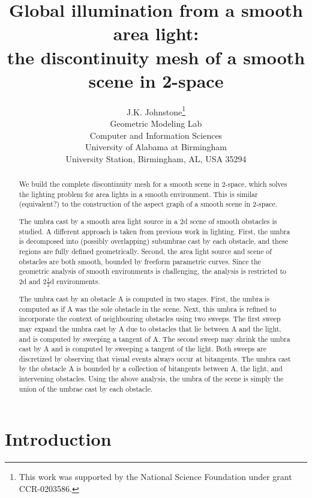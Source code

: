 \documentclass[9pt]{article}
\title{Global illumination from a smooth area light:\\the discontinuity mesh of a smooth scene in 2-space}
\author{J.K. Johnstone\thanks{This work was supported by the National Science Foundation under grant CCR-0203586.}\\
Geometric Modeling Lab\\
Computer and Information Sciences\\
University of Alabama at Birmingham\\
University Station, Birmingham, AL, USA 35294}
\begin{document}
\maketitle


\begin{abstract}

We build the complete discontinuity mesh for a smooth scene in 2-space,
which solves the lighting problem for area lights in a smooth environment.
This is similar (equivalent?) to the construction of the aspect graph
of a smooth scene in 2-space.

The umbra cast by a smooth area light source in a 2d scene of smooth
obstacles is studied.
A different approach is taken from previous work in lighting.
First, the umbra is decomposed into (possibly overlapping) subumbrae cast
by each obstacle, and these regions are fully defined geometrically.
Second, the area light source and scene of obstacles are both smooth,
bounded by freeform parametric curves.
Since the geometric analysis of smooth environments is challenging,
the analysis is restricted to 2d and 2$\frac{1}{2}$d environments.

The umbra cast by an obstacle A is computed in two stages.
First, the umbra is computed as if A was the sole obstacle in the scene.
Next, this umbra is refined to incorporate the context of neighbouring
obstacles using two sweeps.
The first sweep may expand the umbra cast by A due to obstacles that
lie between A and the light, and is computed by sweeping a tangent of A.
The second sweep may shrink the umbra cast by A and is computed by
sweeping a tangent of the light.
Both sweeps are discretized by observing that visual events always occur
at bitangents.
The umbra cast by the obstacle A is bounded by a collection of bitangents
between A, the light, and intervening obstacles.
Using the above analysis, the umbra of the scene is 
simply the union of the umbrae cast by each obstacle.
\end{abstract}




\section{Introduction}
\end{document}
